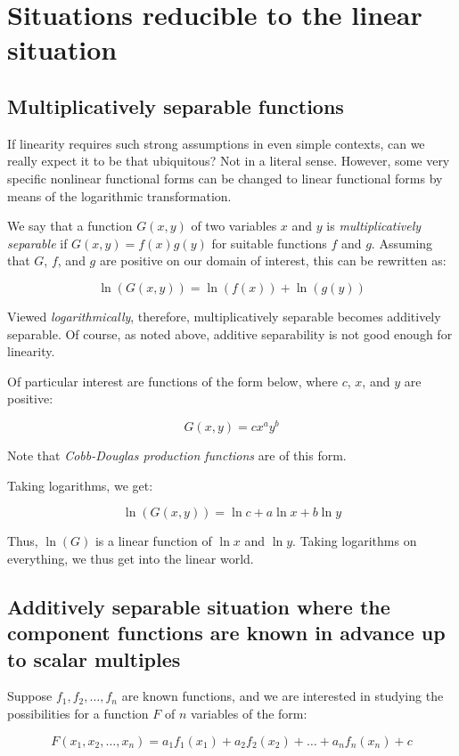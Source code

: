 \documentclass[10pt]{amsart}
\begin{document}
\section{Situations reducible to the linear situation}

\subsection{Multiplicatively separable functions}

If linearity requires such strong assumptions in even simple contexts,
can we really expect it to be that ubiquitous? Not in a literal
sense. However, some very specific nonlinear functional forms can be
changed to linear functional forms by means of the logarithmic transformation.

We say that a function $G(x,y)$ of two variables $x$ and $y$ is {\em
  multiplicatively separable} if $G(x,y) = f(x)g(y)$ for suitable
functions $f$ and $g$. Assuming that $G$, $f$, and $g$ are positive on
our domain of interest, this can be rewritten as:

$$\ln(G(x,y)) = \ln(f(x)) + \ln(g(y))$$

Viewed {\em logarithmically}, therefore, multiplicatively separable
becomes additively separable. Of course, as noted above, additive
separability is not good enough for linearity.

Of particular interest are functions of the form below, where $c$,
$x$, and $y$ are positive:

$$G(x,y) = cx^ay^b$$

Note that {\em Cobb-Douglas production functions} are of this form.

Taking logarithms, we get:

$$\ln(G(x,y)) = \ln c + a \ln x + b \ln y$$

Thus, $\ln(G)$ is a linear function of $\ln x$ and $\ln y$. Taking
logarithms on everything, we thus get into the linear world.

\subsection{Additively separable situation where the component functions are known in advance up to scalar multiples}

Suppose $f_1,f_2,\dots,f_n$ are known functions, and we are interested
in studying the possibilities for a function $F$ of $n$ variables of the form:

$$F(x_1,x_2,\dots,x_n) = a_1f_1(x_1) + a_2f_2(x_2) + \dots + a_nf_n(x_n) + c$$
\end{document}
